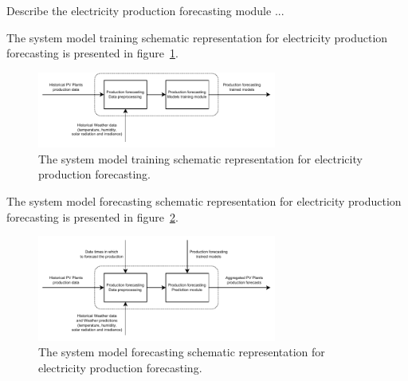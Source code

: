 Describe the electricity production forecasting module ...

The system model training schematic representation for electricity production forecasting is presented in figure~\ref{fig:modeltrainingproduction}.

\begin{figure}[H]
\centering
\includegraphics[width=0.7\textwidth]{images/system_model_training_production}
\caption{The system model training schematic representation for electricity production forecasting.}
\label{fig:modeltrainingproduction}
\end{figure}

The system model forecasting schematic representation for electricity production forecasting is presented in figure~\ref{fig:modelforecastingproduction}.

\begin{figure}[H]
\centering
\includegraphics[width=0.7\textwidth]{images/system_model_forecasting_production}
\caption{The system model forecasting schematic representation for electricity production forecasting.}
\label{fig:modelforecastingproduction}
\end{figure}
